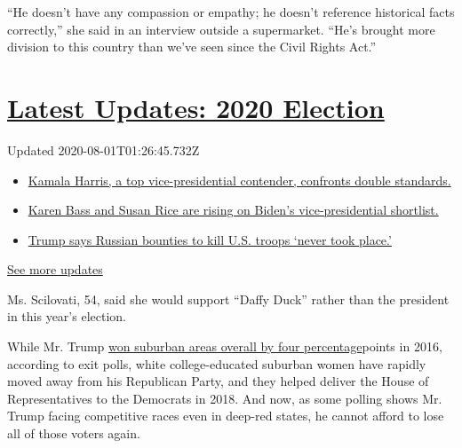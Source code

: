 ``He doesn't have any compassion or empathy; he doesn't reference
historical facts correctly,'' she said in an interview outside a
supermarket. ``He's brought more division to this country than we've
seen since the Civil Rights Act.''

\hypertarget{latest-updates-2020-election}{%
\section{\texorpdfstring{\href{https://www.nytimes.com/2020/07/31/us/elections/biden-vs-trump.html?action=click\&pgtype=Article\&state=default\&region=MAIN_CONTENT_1\&context=storylines_live_updates}{Latest
Updates: 2020
Election}}{Latest Updates: 2020 Election}}\label{latest-updates-2020-election}}

Updated 2020-08-01T01:26:45.732Z

\begin{itemize}
\tightlist
\item
  \href{https://www.nytimes.com/2020/07/31/us/elections/biden-vs-trump.html?action=click\&pgtype=Article\&state=default\&region=MAIN_CONTENT_1\&context=storylines_live_updates\#link-29fdff45}{Kamala
  Harris, a top vice-presidential contender, confronts double
  standards.}
\item
  \href{https://www.nytimes.com/2020/07/31/us/elections/biden-vs-trump.html?action=click\&pgtype=Article\&state=default\&region=MAIN_CONTENT_1\&context=storylines_live_updates\#link-13ec3d9c}{Karen
  Bass and Susan Rice are rising on Biden's vice-presidential
  shortlist.}
\item
  \href{https://www.nytimes.com/2020/07/31/us/elections/biden-vs-trump.html?action=click\&pgtype=Article\&state=default\&region=MAIN_CONTENT_1\&context=storylines_live_updates\#link-49e9a016}{Trump
  says Russian bounties to kill U.S. troops `never took place.'}
\end{itemize}

\href{https://www.nytimes.com/2020/07/31/us/elections/biden-vs-trump.html?action=click\&pgtype=Article\&state=default\&region=MAIN_CONTENT_1\&context=storylines_live_updates}{See
more updates}

Ms. Scilovati, 54, said she would support ``Daffy Duck'' rather than the
president in this year's election.

While Mr. Trump
\href{https://www.cnn.com/election/2016/results/exit-polls}{won suburban
areas overall by four percentage}points in 2016, according to exit
polls, white college-educated suburban women have rapidly moved away
from his Republican Party, and they helped deliver the House of
Representatives to the Democrats in 2018. And now, as some polling shows
Mr. Trump facing competitive races even in deep-red states, he cannot
afford to lose all of those voters again.

